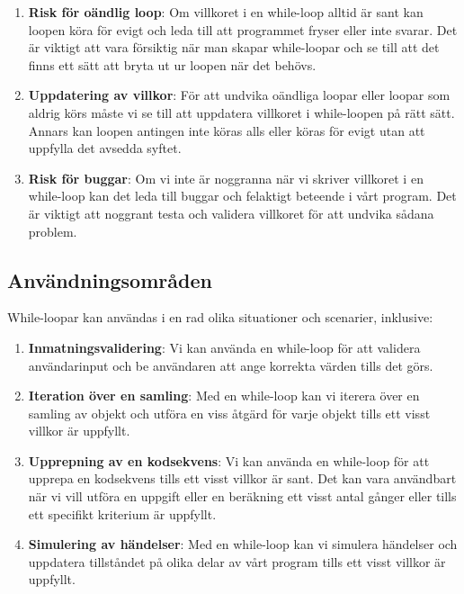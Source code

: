 \begin{enumerate}
\def\labelenumi{\arabic{enumi}.}
\item
  \textbf{Risk för oändlig loop}: Om villkoret i en while-loop alltid är
  sant kan loopen köra för evigt och leda till att programmet fryser
  eller inte svarar. Det är viktigt att vara försiktig när man skapar
  while-loopar och se till att det finns ett sätt att bryta ut ur loopen
  när det behövs.
\item
  \textbf{Uppdatering av villkor}: För att undvika oändliga loopar eller
  loopar som aldrig körs måste vi se till att uppdatera villkoret i
  while-loopen på rätt sätt. Annars kan loopen antingen inte köras alls
  eller köras för evigt utan att uppfylla det avsedda syftet.
\item
  \textbf{Risk för buggar}: Om vi inte är noggranna när vi skriver
  villkoret i en while-loop kan det leda till buggar och felaktigt
  beteende i vårt program. Det är viktigt att noggrant testa och
  validera villkoret för att undvika sådana problem.
\end{enumerate}

\hypertarget{anvuxe4ndningsomruxe5den}{%
\subsection{Användningsområden}\label{anvuxe4ndningsomruxe5den}}

While-loopar kan användas i en rad olika situationer och scenarier,
inklusive:

\begin{enumerate}
\def\labelenumi{\arabic{enumi}.}
\item
  \textbf{Inmatningsvalidering}: Vi kan använda en while-loop för att
  validera användarinput och be användaren att ange korrekta värden
  tills det görs.
\item
  \textbf{Iteration över en samling}: Med en while-loop kan vi iterera
  över en samling av objekt och utföra en viss åtgärd för varje objekt
  tills ett visst villkor är uppfyllt.
\item
  \textbf{Upprepning av en kodsekvens}: Vi kan använda en while-loop för
  att upprepa en kodsekvens tills ett visst villkor är sant. Det kan
  vara användbart när vi vill utföra en uppgift eller en beräkning ett
  visst antal gånger eller tills ett specifikt kriterium är uppfyllt.
\item
  \textbf{Simulering av händelser}: Med en while-loop kan vi simulera
  händelser och uppdatera tillståndet på olika delar av vårt program
  tills ett visst villkor är uppfyllt.
\end{enumerate}

